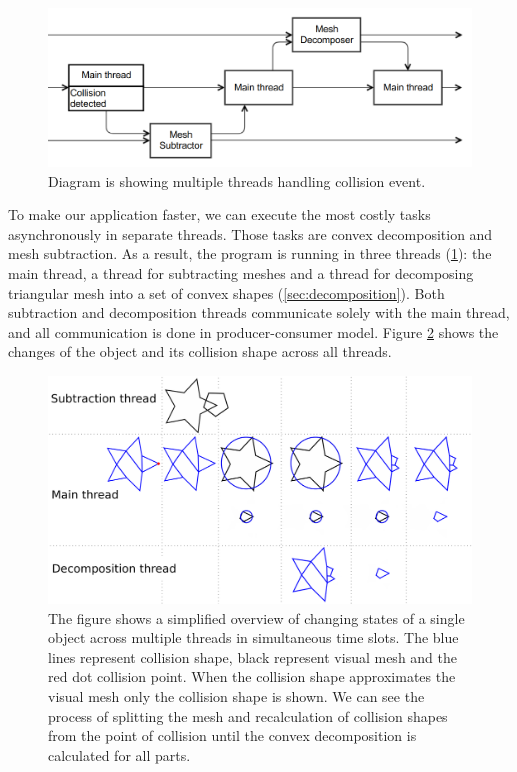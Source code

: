\begin{figure}
        \centering
        \includegraphics[width=\textwidth]{img/decompositionFlow}
        \caption{Diagram is showing multiple threads handling collision event. }
        \label{fig:threads}
\end{figure}
To make our application faster, we can execute the most costly tasks asynchronously in separate threads. Those tasks are convex decomposition and mesh subtraction. As a result, the program is running in three threads (\cref{fig:threads}): the main thread, a thread for subtracting meshes and a thread for decomposing triangular mesh into a set of convex shapes (\cref{sec:decomposition}). Both subtraction and decomposition threads communicate solely with the main thread, and all communication is done in producer-consumer model. Figure \ref{fig:objectInThreads} shows the changes of the object and its collision shape across all threads.

\begin{figure}
        \centering
        \includegraphics[width=\textwidth]{img/object-progress}
        \caption{The figure shows a simplified overview of changing states of a single object across multiple threads in simultaneous time slots. The blue lines represent collision shape, black represent visual mesh and the red dot collision point. When the collision shape approximates the visual mesh only the collision shape is shown. We can see the process of splitting the mesh and recalculation of collision shapes from the point of collision until the convex decomposition is calculated for all parts.}
        \label{fig:objectInThreads}
\end{figure}

